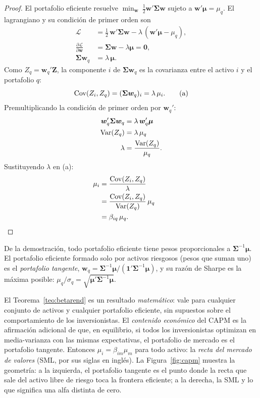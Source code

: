 \begin{proof}
El portafolio eficiente resuelve $\min_{\bm w}\ \tfrac12\bm w'\bm\Sigma\bm w$ sujeto a
$\bm w'\bm\mu=\mu_q$. El lagrangiano y su condición de primer orden son
\begin{align*}
  \mathcal L &= \tfrac12\,\bm w'\bm\Sigma\bm w-\lambda\,(\bm w'\bm\mu-\mu_q),\\
  \frac{\partial\mathcal L}{\partial\bm w} &= \bm\Sigma\bm w-\lambda\bm\mu=\bm0,\\
  \bm\Sigma\bm w_q &= \lambda\,\bm\mu .
\end{align*}
Como $Z_q=\bm w_q'\bm Z$, la componente $i$ de $\bm\Sigma\bm w_q$ es la covarianza entre el activo $i$ y
el portafolio $q$:
\begin{equation}
  \operatorname{Cov}(Z_i,Z_q)=(\bm\Sigma\bm w_q)_i=\lambda\,\mu_i . \tag{a}
\end{equation}
Premultiplicando la condición de primer orden por $\bm w_q'$:
\begin{align*}
  \bm w_q'\bm\Sigma\bm w_q &= \lambda\,\bm w_q'\bm\mu\\
  \operatorname{Var}(Z_q)                &= \lambda\,\mu_q\\
  \lambda                  &= \frac{\operatorname{Var}(Z_q)}{\mu_q} .
\end{align*}
Sustituyendo $\lambda$ en (a):
\begin{align*}
  \mu_i &= \frac{\operatorname{Cov}(Z_i,Z_q)}{\lambda}\\
        &= \frac{\operatorname{Cov}(Z_i,Z_q)}{\operatorname{Var}(Z_q)}\,\mu_q\\
        &= \beta_{iq}\,\mu_q . && \qedhere
\end{align*}
\end{proof}

\begin{corolario}\label{cor:tangente}
De la demostración, todo portafolio eficiente tiene pesos proporcionales a $\bm\Sigma^{-1}\bm\mu$. El
portafolio eficiente formado solo por activos riesgosos (pesos que suman uno) es el \emph{portafolio
tangente}, $\bm w_q=\bm\Sigma^{-1}\bm\mu/(\bm1'\bm\Sigma^{-1}\bm\mu)$, y su razón de Sharpe es la máxima posible:
$\mu_q/\sigma_q=\sqrt{\bm\mu'\bm\Sigma^{-1}\bm\mu}$.
\end{corolario}

El Teorema~\ref{teo:betarend} es un resultado \emph{matemático}: vale para cualquier conjunto de activos y
cualquier portafolio eficiente, sin supuestos sobre el comportamiento de los inversionistas. El
\emph{contenido económico} del CAPM es la afirmación adicional de que, en equilibrio, si todos los
inversionistas optimizan en media-varianza con las mismas expectativas, el portafolio de mercado es el
portafolio tangente. Entonces $\mu_i=\beta_{im}\mu_m$ para todo activo: la \emph{recta del mercado de
valores} (SML, por sus siglas en inglés). La Figura~\ref{fig:capm} muestra la geometría: a la izquierda,
el portafolio tangente es el punto donde la recta que sale del activo libre de riesgo toca la frontera
eficiente; a la derecha, la SML y lo que significa una alfa distinta de cero.

